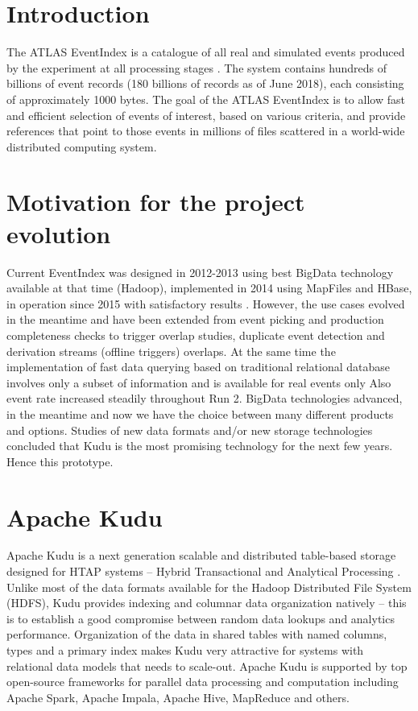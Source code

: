 \documentclass{webofc}
\begin{document}
\section{Introduction}
\label{intro}
The ATLAS EventIndex is a catalogue of all real and simulated events produced by the experiment at all processing stages \cite{RefEI}. 
The system contains hundreds of billions of event records (180 billions of records as of June 2018), each consisting of approximately 1000 bytes. 
The goal of the ATLAS EventIndex is to allow fast and efficient selection of events of interest, based on various criteria, and provide references that point to those events in millions of files scattered in a world-wide distributed computing system.

\section{Motivation for the project evolution}
\label{sec-2}
Current EventIndex was designed in 2012-2013 using best BigData technology available at that time (Hadoop), implemented in 2014 using MapFiles and HBase, in operation since 2015 with satisfactory results \cite{RefEI2}.
However, the use cases evolved in the meantime and have been extended  from event picking and production completeness checks to trigger overlap studies, duplicate event detection and derivation streams (offline triggers) overlaps.
At the same time the implementation of fast data querying based on traditional relational database involves only a subset of information and is available for real events only \cite{RefORA}
Also event rate increased steadily throughout Run 2. \newline
BigData technologies advanced, in the meantime and now we have the choice between many different products and options.  
Studies of new data formats and/or new storage technologies \cite{RefZB} concluded that Kudu is the most promising technology for the next few years. Hence this prototype.

\section{Apache Kudu}
\label{sec-3}
Apache Kudu is a next generation scalable and distributed table-based storage designed for HTAP systems – Hybrid Transactional and Analytical Processing \cite{RefKudu}.
Unlike most of the data formats available for the Hadoop Distributed File System (HDFS), Kudu provides indexing and columnar data organization natively – this is to establish a good compromise between random data lookups and analytics performance.
Organization of the data in shared tables with named columns, types and a primary index makes Kudu very attractive for systems with relational data models that needs to scale-out.
Apache Kudu is supported by top open-source frameworks for parallel data processing and computation including Apache Spark, Apache Impala, Apache Hive, MapReduce and others.
\end{document}
